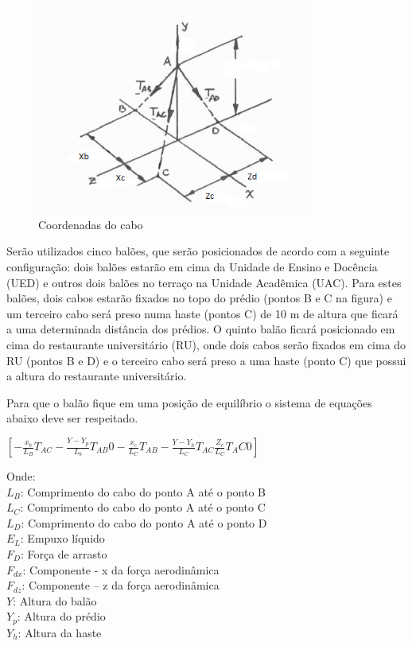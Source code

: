 	\begin{figure}[H]
		\centering
		\includegraphics[width=0.8\textwidth]{figuras/coorcabo}
		\caption{Coordenadas do cabo \cite{beer}}
		\label{img:coordcabos}
	\end{figure}

	Serão utilizados cinco balões, que serão posicionados de acordo com a seguinte configuração: dois balões estarão em cima da Unidade de Ensino e Docência (UED) e outros dois balões no terraço na Unidade Acadêmica (UAC). Para estes balões, dois cabos estarão fixados no topo do prédio (pontos B e C na figura) e um terceiro cabo será preso numa haste (pontos C) de 10 m de altura que ficará a uma determinada distância dos prédios. O quinto balão ficará posicionado em cima do restaurante universitário (RU), onde dois cabos serão fixados em cima do RU (pontos B e D) e o terceiro cabo será preso a uma haste (ponto C) que possui a altura do restaurante universitário.

	Para que o balão fique em uma posição de equilíbrio o sistema de equações abaixo deve ser respeitado.

	$\left [ - \frac{x_{b}}{L_{B}}T_{AC} - \frac{Y-Y_{p}}{L_{b}}T_{AB}0 - \frac{x_{c}}{L_{C}}T_{AB} - \frac{Y-Y_{h}}{L_{C}}T_{AC} \frac{Z_{c}}{L_{C}}T_AC0 \right ]$

	Onde:\\
$L_{B}$: Comprimento do cabo do ponto A até o ponto B\\
$L_{C}$: Comprimento do cabo do ponto A até o ponto C\\
$L_{D}$: Comprimento do cabo do ponto A até o ponto D\\
$E_{L}$: Empuxo líquido\\
$F_{D}$: Força de arrasto\\
$F_{dx}$: Componente - x da força aerodinâmica\\
$F_{dz}$: Componente – z da força aerodinâmica\\
$Y$: Altura do balão\\
$Y_{p}$: Altura do prédio\\
$Y_{h}$: Altura da haste\\

